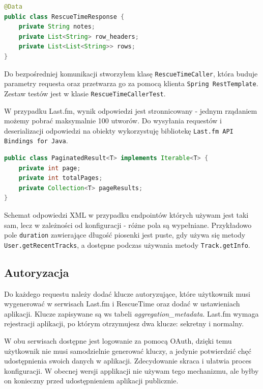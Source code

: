 \documentclass[brudnopis]{xmgr}
\begin{document}
            \begin{lstlisting}[language=java]
@Data
public class RescueTimeResponse {
    private String notes;
    private List<String> row_headers;
    private List<List<String>> rows;
}
            \end{lstlisting}

            Do bezpośredniej komunikacji stworzyłem klasę \verb|RescueTimeCaller|, która buduje parametry requesta
            oraz przetwarza go za pomocą klienta \verb|Spring RestTemplate|. Zestaw testów jest w klasie \verb|RescueTimeCallerTest|.

            W przypadku Last.fm, wynik odpowiedzi jest stronnicowany - jednym rządaniem możemy pobrać maksymalnie 100 utworów.
            Do wysyłania requestów i deserializacji odpowiedzi na obiekty
            wykorzystuję bibliotekę \verb|Last.fm API Bindings for Java|\cite{lastfm:java-bindings}.

            \begin{lstlisting}[language=java]
public class PaginatedResult<T> implements Iterable<T> {
	private int page;
	private int totalPages;
	private Collection<T> pageResults;
}
            \end{lstlisting}

            Schemat odpowiedzi XML w przypadku endpointów których używam jest taki sam, lecz w zależności od konfiguracji - różne pola są wypełniane.
            Przykładowo pole \verb|duration| zawierające długość piosenki jest puste, gdy używa się metody \verb|User.getRecentTracks|,
            a dostępne podczas używania metody \verb|Track.getInfo|.

        \subsection*{Autoryzacja}

        Do każdego requestu należy dodać klucze autoryzujące,
        które użytkownik musi wygenerować w serwisach Last.fm i RescueTime \cite{rescuetime:apidoc-keymanagment} oraz dodać w ustawieniach aplikacji.
        Klucze zapisywane są ws tabeli \textit{aggregation\_metadata}.
        Last.fm wymaga rejestracji aplikacji, po którym otrzymujesz dwa klucze: sekretny i normalny.

        W obu serwisach dostępne jest logowanie za pomocą OAuth, dzięki temu użytkownik nie musi samodzielnie generować kluczy,
        a jedynie potwierdzić chęć udostępnienia swoich danych w aplikacji. Zdecydowanie skraca i ułatwia proces konfiguracji.
        W obecnej wersji applikacji nie używam tego mechanizmu, ale byłby on konieczny przed udostępnieniem aplikacji publicznie.
\end{document}
